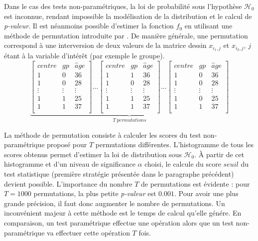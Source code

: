 Dans le cas des tests non-paramétriques, la loi de probabilité sous l'hypothèse $\mathcal{H}_{0}$ est inconnue, 
rendant impossible la modélisation de la distribution et le calcul de \textit{p-valeur}.
Il est néanmoins possible d'estimer la fonction $f_0$ en utilisant une méthode de permutation introduite par \cite{Chung2008}.
De manière générale, une permutation correspond à une interversion de deux valeurs de la matrice dessin $x_{i_{1},j}$ et $x_{i_{2},j}$,
$j$ étant à la variable d'intérêt (par exemple le groupe).\\
\begin{equation}
    \underbrace{
	  \left[\begin{array}{ccc} 
	  centre & gp & \hat{a}ge\\
	  1 & 0 & 36\\
	  1 & 0 & 28\\
	  \vdots & \vdots & \vdots\\
	  1 & 1 & 25\\
	  1 & 1 & 37\\
	  \end{array}\right]
      \ldots
	  \left[\begin{array}{ccc}
	  centre & gp & \hat{a}ge\\
	  1 & 1 & 36\\
	  1 & 0 & 28\\
	  \vdots & \vdots & \vdots\\
	  1 & 1 & 25\\
	  1 & 1 & 37\\
	  \end{array}\right]
      \ldots 
	  \left[\begin{array}{ccc}
	  centre & gp & \hat{a}ge\\
	  1 & 0 & 36\\
	  1 & 0 & 28\\
	  \vdots & \vdots & \vdots\\
	  1 & 0 & 25\\
	  1 & 1 & 37\\
	  \end{array}\right]
	  }_{T\ permutations} \nonumber
\end{equation}

La méthode de permutation consiste à calculer les scores du test non-paramétrique proposé pour $T$ permutations différentes.
L'histogramme de tous les scores obtenus permet d'estimer la loi de distribution sous $\mathcal{H}_{0}$.
À partir de cet histogramme et d'un niveau de significance $\alpha$ choisi, 
le calcule du score $seuil$ du test statistique (première stratégie présentée dans le paragraphe précédent) devient possible.
L'importance du nombre $T$ de permutations est évidente : pour $T=1000$ permutations, la plus petite \textit{p-valeur} est $0.001$. 
Pour avoir une plus grande précision, il faut donc augmenter le nombre de permutations.
Un inconvénient majeur à cette méthode est le temps de calcul qu'elle génére.
En comparaison, un test paramétrique effectue une opération alors que un test non-paramétrique va effectuer cette opération $T$ fois.

